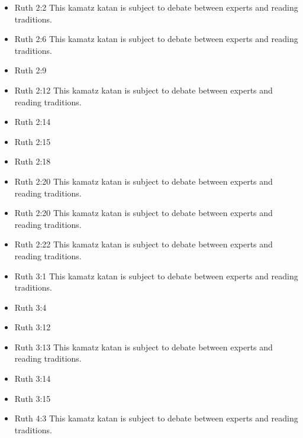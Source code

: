 \documentclass[14pt]{article}
\begin{document}
\begin{multicols}{2}
\begin{itemize}
	\item Ruth 2:2 This kamatz katan is subject to debate between experts and reading traditions.
	
	\item Ruth 2:6 This kamatz katan is subject to debate between experts and reading traditions.
	
	\item Ruth 2:9
	
	\item Ruth 2:12 This kamatz katan is subject to debate between experts and reading traditions.
	
	\item Ruth 2:14
	
	\item Ruth 2:15
	
	\item Ruth 2:18
	
	\item Ruth 2:20 This kamatz katan is subject to debate between experts and reading traditions.
	
	\item Ruth 2:20 This kamatz katan is subject to debate between experts and reading traditions.
	
	\item Ruth 2:22 This kamatz katan is subject to debate between experts and reading traditions.
	
	\item Ruth 3:1 This kamatz katan is subject to debate between experts and reading traditions.
	
	\item Ruth 3:4
	
	\item Ruth 3:12
	
	\item Ruth 3:13 This kamatz katan is subject to debate between experts and reading traditions.
	
	\item Ruth 3:14
	
	\item Ruth 3:15
	
	\item Ruth 4:3 This kamatz katan is subject to debate between experts and reading traditions.
	

\end{itemize}
\end{multicols}
\end{document}
